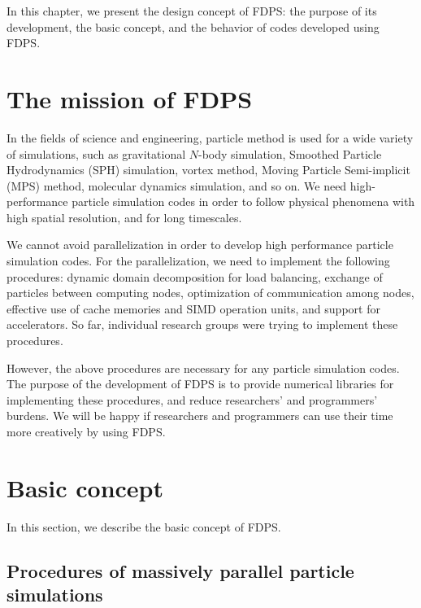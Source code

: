 
In this chapter, we present the design concept of FDPS: the purpose of its development, the basic concept, and the behavior of codes developed using FDPS.

\section{The mission of FDPS}

In the fields of science and engineering, particle method is used for a wide variety of simulations, such as gravitational $N$-body simulation, Smoothed Particle Hydrodynamics (SPH) simulation, vortex method, Moving Particle Semi-implicit (MPS) method, molecular dynamics simulation, and so on. We need high-performance particle simulation codes in order to follow physical phenomena with high spatial resolution, and for long timescales.

We cannot avoid parallelization in order to develop high performance particle simulation codes. For the parallelization, we need to implement the following procedures: dynamic domain decomposition for load balancing, exchange of particles between computing nodes, optimization of communication among nodes, effective use of cache memories and SIMD operation units, and support for accelerators. So far, individual research groups were trying to implement these procedures.

However, the above procedures are necessary for any particle simulation codes. The purpose of the development of FDPS is to provide numerical libraries for implementing these procedures, and reduce researchers' and programmers' burdens. We will be happy if researchers and programmers can use their time more creatively by using FDPS.

\section{Basic concept}
In this section, we describe the basic concept of FDPS.

\subsection{Procedures of massively parallel particle simulations}
\label{subsec:pcr_of_massively_parallel_ptcl_sim}

